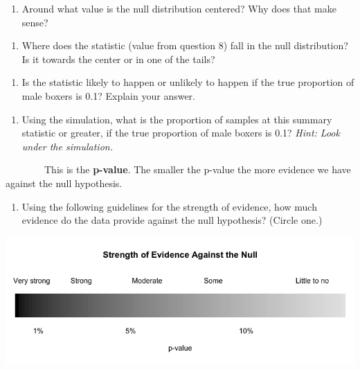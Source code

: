 \documentclass[
]{report}
\providecommand{\tightlist}{%
  \setlength{\itemsep}{0pt}\setlength{\parskip}{0pt}}
\begin{document}
\begin{enumerate}
\def\labelenumi{\arabic{enumi}.}
\setcounter{enumi}{18}
\tightlist
\item
  Around what value is the null distribution centered? Why does that make sense?
\end{enumerate}

\vspace{1in}

\begin{enumerate}
\def\labelenumi{\arabic{enumi}.}
\setcounter{enumi}{19}
\tightlist
\item
  Where does the statistic (value from question 8) fall in the null distribution? Is it towards the center or in one of the tails?
\end{enumerate}

\vspace{1in}

\begin{enumerate}
\def\labelenumi{\arabic{enumi}.}
\setcounter{enumi}{20}
\tightlist
\item
  Is the statistic likely to happen or unlikely to happen if the true proportion of male boxers is 0.1? Explain your answer.
\end{enumerate}

\vspace{1in}

\begin{enumerate}
\def\labelenumi{\arabic{enumi}.}
\setcounter{enumi}{21}
\tightlist
\item
  Using the simulation, what is the proportion of samples at this summary statistic or greater, if the true proportion of male boxers is 0.1? \emph{Hint: Look under the simulation.}
\end{enumerate}

\vspace{1in}

~~~~~~~~This is the \textbf{p-value}. The smaller the p-value the more evidence we have against the null hypothesis.

\begin{enumerate}
\def\labelenumi{\arabic{enumi}.}
\setcounter{enumi}{22}
\tightlist
\item
  Using the following guidelines for the strength of evidence, how much evidence do the data provide against the null hypothesis? (Circle one.)
\end{enumerate}

\includegraphics{images/soe_gradient_grayscale.png}
\end{document}
